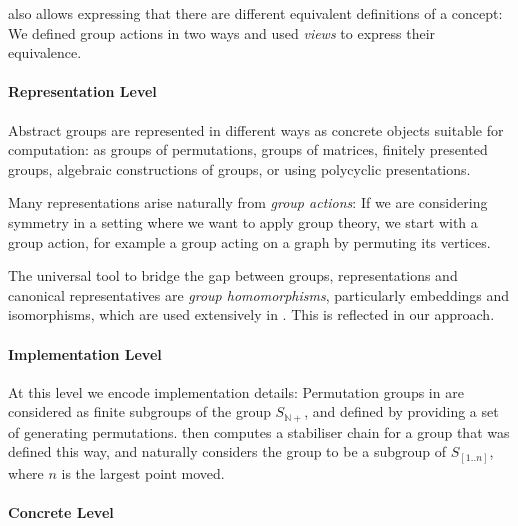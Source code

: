 \OMMT also allows expressing that there are different equivalent definitions of
a concept: We defined group actions in two ways and used \emph{views} to express
their equivalence.

\paragraph{Representation Level} 
Abstract groups are represented in different ways as concrete objects
suitable for computation: as groups of permutations, groups of matrices,
finitely presented groups, algebraic constructions of groups, or using
polycyclic presentations.


Many representations arise naturally from \emph{group actions}: If we are
considering symmetry in a setting where we want to apply group theory, we start
with a group action, for example a group acting on a graph by permuting its
vertices.


The universal tool to bridge the gap between groups, representations and
canonical representatives are \emph{group homomorphisms}, particularly
embeddings and isomorphisms, which are used extensively in \GAP. This is
reflected in our approach.

\paragraph{Implementation Level}
At this level we encode implementation details: Permutation groups in \GAP
are considered as finite subgroups of the group $S_{\mathbb{N}+}$, and defined by
providing a set of generating permutations. \GAP then computes a stabiliser chain
for a group that was defined this way, and naturally considers the group to be a
subgroup of $S_{[1..n]}$, where $n$ is the largest point moved.

\paragraph{Concrete Level}

